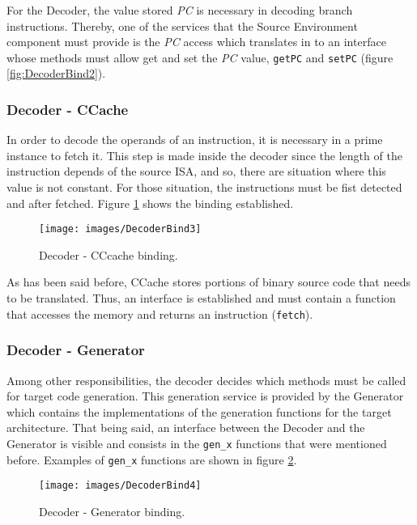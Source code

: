     For the Decoder, the value stored \textit{PC} is necessary in decoding branch instructions. Thereby, one of the services that the Source Environment component must provide is the \textit{PC} access which translates in to an interface whose methods must allow get and set the \textit{PC} value, \texttt{getPC} and \texttt{setPC} (figure \ref{fig:DecoderBind2}). 
     
    \subsubsection*{Decoder - CCache}
    In order to decode the operands of an instruction, it is necessary in a prime instance to fetch it. This step is made inside the decoder since the length of the instruction depends of the source ISA, and so, there are situation where this value is not constant. For those situation, the instructions must be fist detected and after fetched. Figure \ref{fig:DecoderBind3} shows the binding established.
    
    \begin{figure}[!htb]
    \centerline{
    \texttt{[image: images/DecoderBind3]}
    }
    \caption{Decoder - CCcache binding.}
    \label{fig:DecoderBind3} 
    \end{figure}
    
    As has been said before, CCache stores portions of binary source code that needs to be translated. Thus, an interface is established and must contain a function that accesses the memory and returns an instruction (\texttt{fetch}). 
       
    \subsubsection*{Decoder - Generator}
    
    Among other responsibilities, the decoder decides which methods must be called for target code generation. This generation service is provided by the Generator which contains the implementations of the generation functions for the target architecture.
	That being said, an interface between the Decoder and the Generator is visible and consists in the \texttt{gen\_x} functions that were mentioned before. Examples of \texttt{gen\_x} functions are shown in figure \ref{fig:DecoderBind4}.
    
    \begin{figure}[!htb]
    \centerline{
    \texttt{[image: images/DecoderBind4]}
    }
    \caption{Decoder - Generator binding.}
    \label{fig:DecoderBind4} 
    \end{figure}
    
